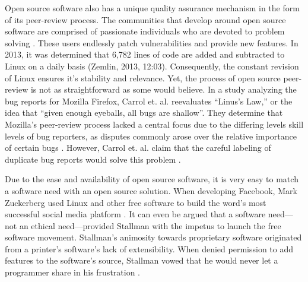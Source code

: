 Open source software also has a unique quality assurance mechanism in the form of its peer-review process. The communities that develop around open source software are comprised of passionate individuals who are devoted to problem solving \cite[p. 19]{bisson}. These users endlessly patch vulnerabilities and provide new features. In 2013, it was determined that 6,782 lines of code are added and subtracted to Linux on a daily basis (Zemlin, 2013, 12:03). Consequently, the  constant revision of Linux ensures it's stability and relevance. Yet, the process of open source peer-review is not as straightforward as some would believe. In a study analyzing the bug reports for Mozilla Firefox, Carrol et. al. reevaluates “Linus's Law,” or the idea that “given enough eyeballs, all bugs are shallow”\cite[p. 52]{wang}.  They determine that Mozilla's peer-review process lacked a central focus due to the differing levels skill levels of bug reporters, as disputes commonly arose over the relative importance of certain bugs \citeyear[p. 52]{wang}. However, Carrol et. al.  claim that the careful labeling of duplicate bug reports would solve this problem \citeyear[p. 52]{wang}. 

Due to the ease and availability of open source software, it is very easy to match a software need with an open source solution. When developing Facebook, Mark Zuckerberg used Linux and other free software to build the word's most successful social media platform \cite[6:18]{zemlin}. It can even be argued that a software need—not an ethical need—provided Stallman with the impetus to launch the free software movement. Stallman's animosity towards proprietary software originated from a printer's software's lack of extensibility. When denied permission to add features to the software's source, Stallman vowed that he would never let a programmer share in his frustration \citeyear[para. 19]{rms2015}.  
	
	
	
	
